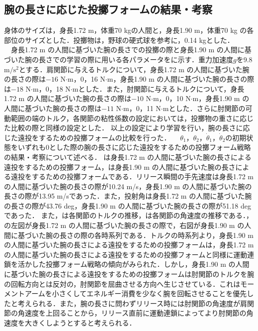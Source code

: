 \begin{small}
\subsection{腕の長さに応じた投擲フォームの結果・考察}
身体のサイズは，身長1.72 m，体重70 kgの人間と，身長1.90 m，体重70 kg の各部位のサイズとした．投擲物は，野球の硬式球を参考に，0.14 kgとした．\\
　身長1.72 m の人間に基づいた腕の長さでの投擲の際と身長1.90 m の人間に基づいた腕の長さでの学習の際に用いる各パラメータをに示す．重力加速度$g$を9.8 $\mathrm{m/s^{2}}$とする．肩関節に与えるトルクについて，身長1.72 m の人間に基づいた腕の長さの際は$-16$ N$\cdot$m，0，16 N$\cdot$m，身長1.90 m の人間に基づいた腕の長さの際は$-18$ N$\cdot$m，0，18 N$\cdot$mとした．また，肘関節に与えるトルクについて，身長1.72 m の人間に基づいた腕の長さの際は$-10$ N$\cdot$m，0，10 N$\cdot$m，身長1.90 m の人間に基づいた腕の長さの際は$-11$ N$\cdot$m，0，11 N$\cdot$mとした．さらに肘関節の可動範囲の端のトルク，各関節の粘性係数の設定においては，投擲物の重さに応じた比較の際と同様の設定とした．
以上の設定により学習を行い，腕の長さに応じた遠投をするための投擲フォームの比較を行った．
　$\theta_{1}$，$\theta_{2}$，$\dot{\theta}_{1}$，$\dot{\theta}_{2}$の初期状態をいずれも0とした際の腕の長さに応じた遠投をするための投擲フォーム戦略の結果・考察について述べる．
は身長1.72 m の人間に基づいた腕の長さによる遠投をするための投擲フォーム，は身長1.90 m の人間に基づいた腕の長さによる遠投をするための投擲フォームである．リリース瞬間の手先速度は身長1.72 m の人間に基づいた腕の長さの際が10.24 m/s，身長1.90 m の人間に基づいた腕の長さの際が13.95 m/sであった．また，投射角は身長1.72 m の人間に基づいた腕の長さの際が43.76 deg，身長1.90 m の人間に基づいた腕の長さの際が51.18 deg であった．
また，は各関節のトルクの推移，は各関節の角速度の推移である．，の左図が身長1.72 m の人間に基づいた腕の長さの際で，右図が身長1.90 m の人間に基づいた腕の長さの際の各時系列である．トルクの時系列より，身長1.90 m の人間に基づいた腕の長さによる遠投をするための投擲フォームは，身長1.72 m の人間に基づいた腕の長さによる遠投をするための投擲フォームと同様に運動連鎖を活かした投擲フォーム戦略の傾向がみられた．しかし，身長1.90 m の人間に基づいた腕の長さによる遠投をするための投擲フォームは肘関節のトルクを腕の回転方向とは反対の，肘関節を屈曲させる方向へ生じさせている．これはモーメントアームを小さくしてエネルギー消費を少なく腕を回転させることを優先したと考えられる．また，腕の長さに問わずリリース時には肘関節の角速度が肩関節の角速度を上回ることから，リリース直前に運動連鎖によってより肘関節の角速度を大きくしようとすると考えられる．

\end{small}
